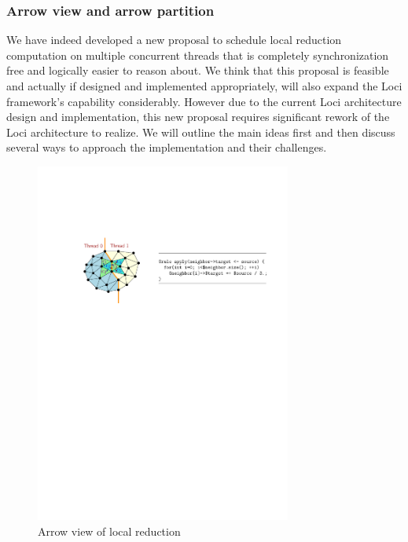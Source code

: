 \documentclass{article}
\begin{document}
\subsubsection{Arrow view and arrow partition}
We have indeed developed a new proposal to schedule local reduction
computation on multiple concurrent threads that is completely
synchronization free and logically easier to reason about.  We think
that this proposal is feasible and actually if designed and implemented
appropriately, will also expand the Loci framework's capability
considerably.  However due to the current Loci architecture design and
implementation, this new proposal requires significant rework of the
Loci architecture to realize.  We will outline the main ideas first and
then discuss several ways to approach the implementation and their
challenges.

\begin{figure}[h]
  \begin{center}
    \includegraphics[width=0.75\textwidth]{arrows}
    \caption{Arrow view of local reduction\label{fig:arrows}}
  \end{center}
\end{figure}
\end{document}
